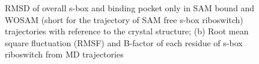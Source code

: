 \documentclass[a4paper,10pt]{article}
\begin{document}
\begin{figure}
\begin{center}
    \newline
\end{center}
\caption{RMSD of overall s-box and binding pocket only in SAM bound and WOSAM (short for the 
trajectory of SAM free s-box riboswitch) trajectories  with reference to the crystal structure; (b) Root mean square fluctuation (RMSF) and B-factor of each residue of s-box riboswitch from MD trajectories}
\end{figure}
\end{document}
